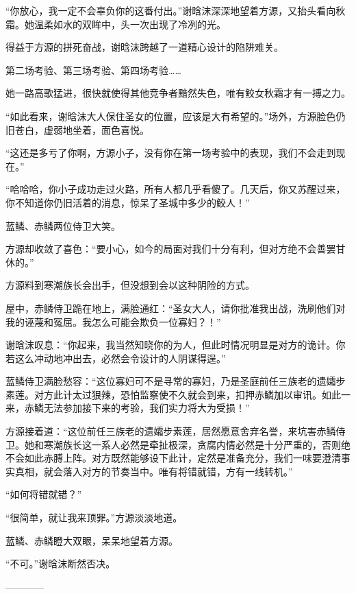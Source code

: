 \begin{this_body}
“你放心，我一定不会辜负你的这番付出。”谢晗沫深深地望着方源，又抬头看向秋霜。她温柔如水的双眸中，头一次出现了冷冽的光。

得益于方源的拼死奋战，谢晗沫跨越了一道精心设计的陷阱难关。

第二场考验、第三场考验、第四场考验……

她一路高歌猛进，很快就使得其他竞争者黯然失色，唯有鲛女秋霜才有一搏之力。

“如此看来，谢晗沫大人保住圣女的位置，应该是大有希望的。”场外，方源脸色仍旧苍白，虚弱地坐着，面色喜悦。

“这还是多亏了你啊，方源小子，没有你在第一场考验中的表现，我们不会走到现在。”

“哈哈哈，你小子成功走过火路，所有人都几乎看傻了。几天后，你又苏醒过来，你不知道你仍旧活着的消息，惊呆了圣城中多少的鲛人！”

蓝鳞、赤鳞两位侍卫大笑。

方源却收敛了喜色：“要小心，如今的局面对我们十分有利，但对方绝不会善罢甘休的。”

方源料到寒潮族长会出手，但没想到会以这种阴险的方式。

屋中，赤鳞侍卫跪在地上，满脸通红：“圣女大人，请你批准我出战，洗刷他们对我的诬蔑和冤屈。我怎么可能会欺负一位寡妇？！”

谢晗沫叹息：“你起来，我当然知晓你的为人，但此时情况明显是对方的诡计。你若这么冲动地冲出去，必然会令设计的人阴谋得逞。”

蓝鳞侍卫满脸愁容：“这位寡妇可不是寻常的寡妇，乃是圣庭前任三族老的遗孀步素莲。对方此计太过狠辣，恐怕监察使不久就会到来，扣押赤鳞加以审讯。如此一来，赤鳞无法参加接下来的考验，我们实力将大为受损！”

方源接着道：“这位前任三族老的遗孀步素莲，居然愿意舍弃名誉，来坑害赤鳞侍卫。她和寒潮族长这一系人必然是牵扯极深，贪腐内情必然是十分严重的，否则绝不会如此赤膊上阵。对方既然能够设下此计，定然是准备充分，我们一味要澄清事实真相，就会落入对方的节奏当中。唯有将错就错，方有一线转机。”

“如何将错就错？”

“很简单，就让我来顶罪。”方源淡淡地道。

蓝鳞、赤鳞瞪大双眼，呆呆地望着方源。

“不可。”谢晗沫断然否决。

------------

\end{this_body}

